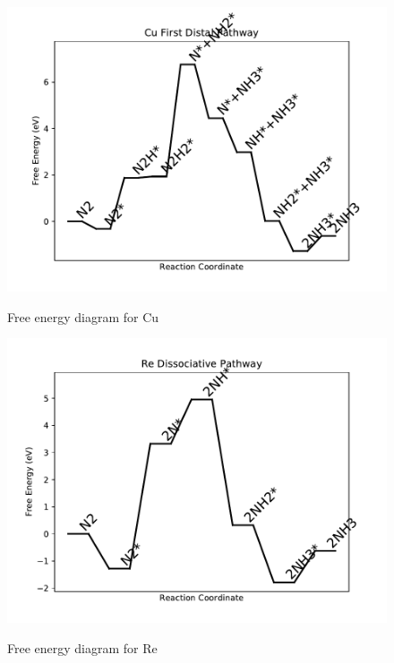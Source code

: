 \documentclass[journal=jacsat,manuscript=article]{achemso}
\begin{document}
\begin{figure}
\includegraphics[width=1\linewidth]{data/plots/Cu_distal_1.pdf}
\label{fig:Cu_distal_1}
\caption{Free energy diagram for Cu}
\end{figure}

\newpage
\begin{figure}
\includegraphics[width=1\linewidth]{data/plots/Re_dissociative.pdf}
\label{fig:Re_dissociative}
\caption{Free energy diagram for Re}
\end{figure}
\end{document}
